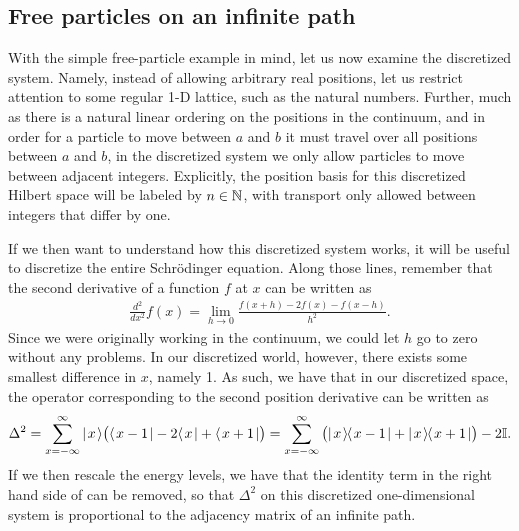 \documentclass[../thesis-main/thesis-main]{subfiles}
\begin{document}
\subsection{Free particles on an infinite path}

With the simple free-particle example in mind, let us now examine the discretized system.  Namely, instead of allowing arbitrary real positions, let us restrict attention to some regular 1-D lattice, such as the natural numbers.  Further, much as there is a natural linear ordering on the positions in the continuum, and in order for a particle to move between $a$ and $b$ it must travel over all positions between $a$ and $b$, in the discretized system we only allow particles to move between adjacent integers.  Explicitly, the position basis for this discretized Hilbert space will be labeled by $n\in \mathbb{N}$, with transport only allowed between integers that differ by one.

If we then want to understand how this discretized system works, it will be useful to discretize the entire Schr\"{o}dinger equation.  Along those lines, remember that the second derivative of a function $f$ at $x$ can be written as
\begin{align}
  \frac{d^2}{dx^2} f(x) = \lim_{h\rightarrow 0} \frac{f(x+h) - 2 f(x) - f(x-h)}{h^2}.
\end{align}
Since we were originally working in the continuum, we could let $h$ go to zero without any problems.  In our discretized world, however, there exists some smallest difference in $x$, namely 1.  As such, we have that in our discretized space, the operator corresponding to the second position derivative can be written as
\begin{equation}
  \Delta^2 = \sum_{x=-\infty}^\infty |\mspace{2mu} x \mspace{2mu} \rangle \big(\langle\mspace{2mu} x-1 \mspace{2mu} | - 2 \langle\mspace{2mu} x \mspace{2mu} | + \langle\mspace{2mu} x+1 \mspace{2mu} |\big) = \sum_{x=-\infty}^\infty \big(|\mspace{2mu} x \mspace{2mu} \rangle\mspace{-2mu}\langle\mspace{2mu} x-1 \mspace{2mu} | + |\mspace{2mu} x \mspace{2mu} \rangle\mspace{-2mu}\langle\mspace{2mu} x+1 \mspace{2mu} |\big) - 2 \mathbb{I}.
\label{eq:discrete_second_derivative}
\end{equation}
If we then rescale the energy levels, we have that the identity term in the right hand side of  can be removed, so that $\Delta^2$ on this discretized one-dimensional system is proportional to the adjacency matrix of an infinite path.  
\end{document}
